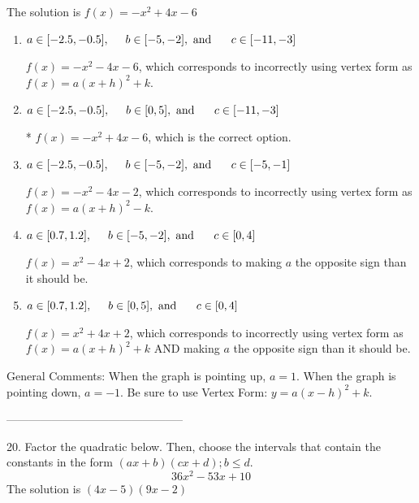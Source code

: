 \documentclass{article}[14pt]
\begin{document}
The solution is $ f(x) = -x^{2} +4 x -6 $ 

\begin{enumerate}[label=\Alph*.] 
\item $ a \in [-2.5, -0.5], \hspace*{5mm} b \in [-5, -2], \text{ and } \hspace*{5mm} c \in [-11, -3] $ 

 $f(x)=-x^{2} -4 x -6$, which corresponds to incorrectly using vertex form as $f(x) = a(x+h)^2+k$. 
\item $ a \in [-2.5, -0.5], \hspace*{5mm} b \in [0, 5], \text{ and } \hspace*{5mm} c \in [-11, -3] $ 

 * $f(x)=-x^{2} +4 x -6$, which is the correct option. 
\item $ a \in [-2.5, -0.5], \hspace*{5mm} b \in [-5, -2], \text{ and } \hspace*{5mm} c \in [-5, -1] $ 

 $f(x)=-x^{2} -4 x -2$, which corresponds to incorrectly using vertex form as $f(x) = a(x+h)^2 - k$. 
\item $ a \in [0.7, 1.2], \hspace*{5mm} b \in [-5, -2], \text{ and } \hspace*{5mm} c \in [0, 4] $ 

 $f(x)=x^{2} -4 x + 2$, which corresponds to making $a$ the opposite sign than it should be. 
\item $ a \in [0.7, 1.2], \hspace*{5mm} b \in [0, 5], \text{ and } \hspace*{5mm} c \in [0, 4] $ 

 $f(x)=x^{2} +4 x + 2$, which corresponds to incorrectly using vertex form as $f(x) = a(x+h)^2+k$ AND making $a$ the opposite sign than it should be. 
\end{enumerate} 
 
General Comments: When the graph is pointing up, $a=1$. When the graph is pointing down, $a=-1$. Be sure to use Vertex Form: $y = a(x-h)^2+k$.

-----------------------------------------------

20. Factor the quadratic below. Then, choose the intervals that contain the constants in the form $(ax+b)(cx+d); b \leq d.$
$$ 36x^{2} -53 x + 10 $$ 
The solution is $ (4x -5)(9x -2) $ 
\end{document}
